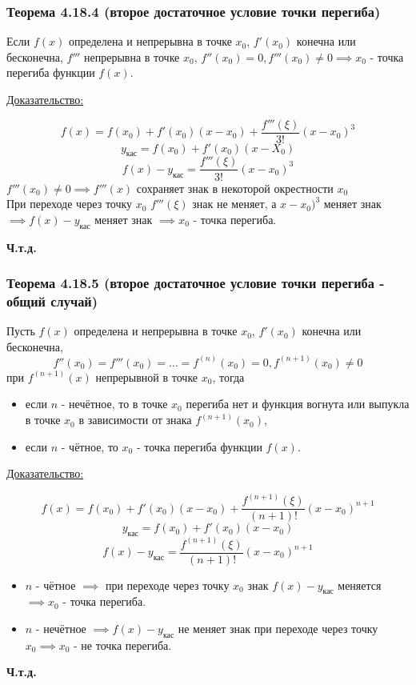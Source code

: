 \documentclass[12pt]{article}
\begin{document}
    \subsubsection*{Теорема 4.18.4 (второе достаточное условие точки перегиба)}\label{th:4.18.4}
    Если $f(x)$ определена и непрерывна в точке $x_0$, $f'(x_0)$ конечна или бесконечна, $f'''$ непрерывна в точке $x_0$, $f''(x_0) = 0, f'''(x_0) \ne 0 \implies x_0$ - точка перегиба функции $f(x)$.\par\noindent
    \underline{Доказательство:}
    \begin{adjustwidth}{1.5em}{1.5em}
        \[ f(x) = f(x_0) + f'(x_0)(x-x_0) + \frac{f'''(\xi)}{3!}(x-x_0)^3 \]
        \[ y_{\text{кас}} = f(x_0) + f'(x_0)(x-X_0) \]
        \[ f(x) - y_{\text{кас}} = \boxed{ \frac{f'''(\xi)}{3!}(x-x_0)^3 } \]
        $f'''(x_0) \ne 0 \implies f'''(x)$ сохраняет знак в некоторой окрестности $x_0$\\
        При переходе через точку $x_0$ $f'''(\xi)$ знак не меняет, а $x - x_0)^3$ меняет знак $\implies f(x) - y_{\text{кас}}$ меняет знак $\implies x_0$ - точка перегиба.
        \begin{center}
            \textbf{Ч.т.д.}
        \end{center}
    \end{adjustwidth}

    \subsubsection*{Теорема 4.18.5 (второе достаточное условие точки перегиба - общий случай)}\label{th:4.18.5}
    Пусть $f(x)$ определена и непрерывна в точке $x_0$, $f'(x_0)$ конечна или бесконечна,
    \[ f''(x_0) = f'''(x_0) = \dots = f^{(n)}(x_0) = 0, f^{(n+1)}(x_0) \ne 0 \]
    при $f^{(n+1)}(x)$ непрерывной в точке $x_0$, тогда \begin{itemize}
        \item если $n$ - нечётное, то в точке $x_0$ перегиба нет и функция вогнута или выпукла в точке $x_0$ в зависимости от знака $f^{(n+1)}(x_0)$,
        \item если $n$ - чётное, то $x_0$ - точка перегиба функции $f(x)$.
    \end{itemize}
    \underline{Доказательство:}
    \begin{adjustwidth}{1.5em}{1.5em}
        \[ f(x) = f(x_0) + f'(x_0)(x-x_0) + \frac{f^{(n+1)}(\xi)}{(n+1)!}(x-x_0)^{n+1} \]
        \[ y_{\text{кас}} = f(x_0) + f'(x_0)(x-x_0) \]
        \[ f(x) - y_{\text{кас}} = \frac{f^{(n+1)}(\xi)}{(n+1)!}(x-x_0)^{n+1} \]
        \begin{itemize}
            \item $n$ - чётное $\implies$ при переходе через точку $x_0$ знак $f(x) - y_{\text{кас}}$ меняется $\implies x_0$ - точка перегиба.
            \item $n$ - нечётное $\implies f(x) - y_{\text{кас}}$ не меняет знак при переходе через точку $x_0 \implies x_0$ - не точка перегиба.
        \end{itemize}
        \begin{center}
            \textbf{Ч.т.д.}
        \end{center}
    \end{adjustwidth}
    
\end{document}
